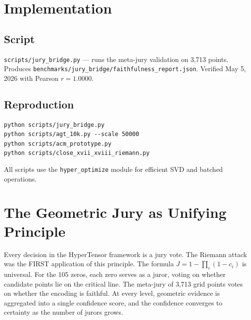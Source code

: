\documentclass[11pt,a4paper]{article}
\begin{document}
\section{Implementation}

\subsection{Script}

\texttt{scripts/jury\_bridge.py} --- runs the meta-jury validation on 3,713 points. Produces \texttt{benchmarks/jury\_bridge/faithfulness\_report.json}. Verified May 5, 2026 with Pearson $r = 1.0000$.

\subsection{Reproduction}

\begin{verbatim}
python scripts/jury_bridge.py
python scripts/agt_10k.py --scale 50000
python scripts/acm_prototype.py
python scripts/close_xvii_xviii_riemann.py
\end{verbatim}

All scripts use the \texttt{hyper\_optimize} module for efficient SVD and batched operations.

\section{The Geometric Jury as Unifying Principle}

Every decision in the HyperTensor framework is a jury vote. The Riemann attack was the FIRST application of this principle. The formula $J = 1 - \prod_i (1-c_i)$ is universal. For the 105 zeros, each zero serves as a juror, voting on whether candidate points lie on the critical line. The meta-jury of 3,713 grid points votes on whether the encoding is faithful. At every level, geometric evidence is aggregated into a single confidence score, and the confidence converges to certainty as the number of jurors grows.
\end{document}
